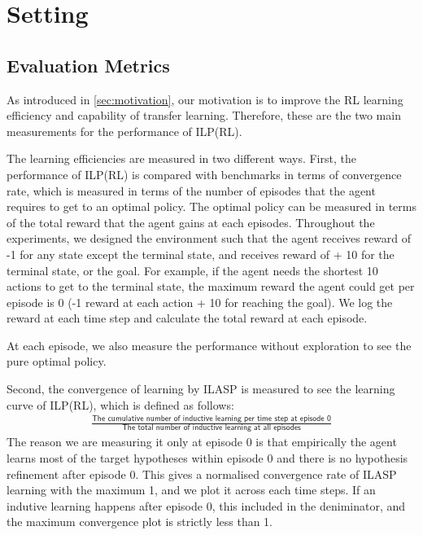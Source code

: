 \section{Setting}
\label{sec:setting}

\subsection{Evaluation Metrics}
\label{subsec:evaluation_metrics}

As introduced in \ref{sec:motivation}, our motivation is to improve the RL learning efficiency and capability of transfer learning.
Therefore, these are the two main measurements for the performance of ILP(RL).

The learning efficiencies are measured in two different ways. First, the performance of ILP(RL) is compared with benchmarks in terms of
convergence rate, which is measured in terms of the number of episodes that the agent requires to get to an optimal policy.
The optimal policy can be measured in terms of the total reward that the agent gains at each episodes. 
Throughout the experiments, we designed the environment such that the agent receives reward of -1 for any state except the terminal state, and receives reward of + 10 for the terminal state, or the goal.
For example, if the agent needs the shortest 10 actions to get to the terminal state, the maximum reward the agent could get per episode is 0 (-1 reward at each action + 10 for reaching the goal).
We log the reward at each time step and calculate the total reward at each episode. 

At each episode, we also measure the performance without exploration to see the pure optimal policy.

Second, the convergence of learning by ILASP is measured to see the learning curve of ILP(RL), which is defined as follows:
\begin{equation}
\begin{split}
\frac{\textsf{The cumulative number of inductive learning per time step at episode 0}}{\textsf{The total number of inductive learning at all episodes}}
\end{split}
\end{equation}
The reason we are measuring it only at episode 0 is that empirically the agent learns most of the target hypotheses within episode 0 and there is no hypothesis refinement after episode 0.
This gives a normalised convergence rate of ILASP learning with the maximum 1, and we plot it across each time steps. 
If an indutive learning happens after episode 0, this included in the deniminator, and the maximum convergence plot is strictly less than 1.


